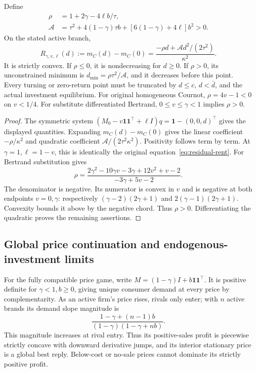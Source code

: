\begin{proposition}
\label{prop:r19-residual}
Define
\begin{align*}
\rho&=1+2\gamma-4\ell b/\tau,\\
\mathcal A&=\tau^2+4(1-\gamma)\tau b+
 [6(1-\gamma)+4\ell]b^2>0.
\end{align*}
On the stated active branch,
\[
R_{\gamma,v,\ell}(d):=m_C(d)-m_C(0)
=\frac{-\rho d+\mathcal A d^2/(2\tau^2)}{\kappa^2}.
\]
It is strictly convex. If \(\rho\le0\), it is nondecreasing for
\(d\ge0\). If \(\rho>0\), its unconstrained minimum is
\(d_{\min}=\rho\tau^2/\mathcal A\), and it decreases before this
point. Every turning or zero-return point must be truncated by
\(d\le c\), \(d<\bar d\), and the actual investment equilibrium.
For original homogeneous Cournot, \(\rho=4v-1<0\) on \(v<1/4\).
For substitute differentiated Bertrand, \(0\le v\le\gamma<1\)
implies \(\rho>0\).
\end{proposition}
\begin{proof}
The symmetric system
\((M_0-v\mathbf1\mathbf1^\top+\ell I)q
=\mathbf1-(0,0,d)^\top\) gives the displayed quantities. Expanding
\(m_C(d)-m_C(0)\) gives the linear coefficient
\(-\rho/\kappa^2\) and quadratic coefficient
\(\mathcal A/(2\tau^2\kappa^2)\).
Positivity follows term by term. At \(\gamma=1,\ell=1-v\),
this is identically the original equation~\eqref{eq:residual-rent}.
For Bertrand substitution gives
\[
\rho=\frac{2\gamma^2-10\gamma v-3\gamma+12v^2+v-2}
{-3\gamma+5v-2}.
\]
The denominator is negative. Its numerator is convex in \(v\) and is
negative at both endpoints \(v=0,\gamma\): respectively
\((\gamma-2)(2\gamma+1)\) and
\(2(\gamma-1)(2\gamma+1)\). Convexity bounds it above by the
negative chord. Thus \(\rho>0\). Differentiating the quadratic
proves the remaining assertions.
\end{proof}

\subsection{Global price continuation and endogenous-investment limits}
For the fully compatible price game, write
\(M=(1-\gamma)I+b\mathbf1\mathbf1^\top\).
It is positive definite for \(\gamma<1,b\ge0\), giving unique
consumer demand at every price by complementarity. As an active firm's
price rises, rivals only enter; with \(n\) active brands its demand slope
magnitude is
\[
\frac{1-\gamma+(n-1)b}{(1-\gamma)(1-\gamma+nb)}.
\]
This magnitude increases at rival entry. Thus its positive-sales profit
is piecewise strictly concave with downward derivative jumps, and its
interior stationary price is a global best reply. Below-cost or no-sale
prices cannot dominate its strictly positive profit.

